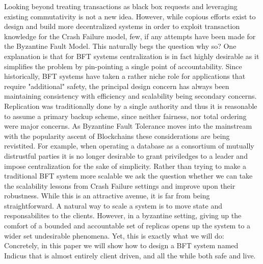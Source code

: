 Looking beyond treating transactions as black box requests and leveraging existing commutativity is not a new idea. However, while copious efforts exist to design and build more decentralized systems in order to exploit transaction knowledge for the Crash Failure model, few, if any attempts have been made for the Byzantine Fault Model. This naturally begs the question why so? One explanation is that for BFT systems centralization is in fact highly desirable as it simplifies the problem by pin-pointing a single point of accountability. Since historically, BFT systems have taken a rather niche role for applications that require "additional" safety, the principal design concern has always been maintaining consistency with efficiency and scalability being secondary concerns. Replication was traditionally done by a single authority and thus it is reasonable to assume a primary backup scheme, since neither fairness, nor total ordering were major concerns. As Byzantine Fault Tolerance moves into the mainstream with the popularity ascent of Blockchains these considerations are being revistited. For example, when operating a database as a consortium of mutually distrustful parties it is no longer desirable to grant priviledges to a leader and impose centralization for the sake of simplicity.
Rather than trying to make a traditional BFT system more scalable we ask the question whether we can take the scalability lessons from Crash Failure settings and improve upon their robustness. While this is an attractive avenue, it is far from being straightforward. A natural way to scale a system is to move state and responsabilites to the clients.  
However, in a byzantine setting, giving up the comfort of a bounded and accountable set of replicas opens up the system to a wider set undesirable phenomena. Yet, this is exactly what we will do: Concretely, in this paper we will show how to design a BFT system named Indicus that is almost entirely client driven, and all the while both safe and live. \\

